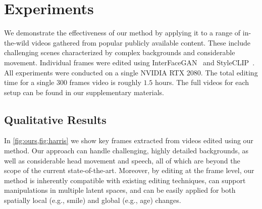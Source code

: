 \section{Experiments}

We demonstrate the effectiveness of our method by applying it to a range of in-the-wild videos gathered from popular publicly available content. These include challenging scenes characterized by complex backgrounds and considerable movement.
Individual frames were edited using InterFaceGAN~\cite{shen2020interpreting} and StyleCLIP~\cite{patashnik2021styleclip}. All experiments were conducted on a single NVIDIA RTX 2080. The total editing time for a single $300$ frames video is roughly $1.5$ hours.
The full videos for each setup can be found in our supplementary materials.

\subsection{Qualitative Results}





In \cref{fig:ours,fig:harris} we show key frames extracted from videos edited using our method. Our approach can handle challenging, highly detailed backgrounds, as well as considerable head movement and speech, all of which are beyond the scope of the current state-of-the-art. Moreover, by editing at the frame level, our method is inherently compatible with existing editing techniques, can support manipulations in multiple latent spaces, and can be easily applied for both spatially local (e.g., smile) and global (e.g., age) changes. 





